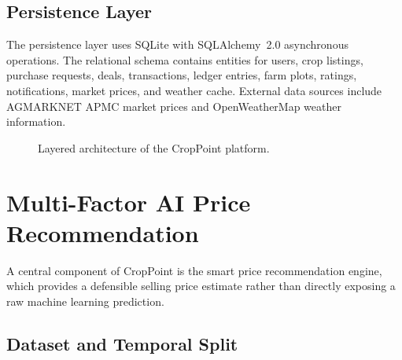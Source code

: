 \documentclass[conference]{IEEEtran}
\begin{document}
\subsection{Persistence Layer}

The persistence layer uses SQLite with SQLAlchemy~2.0 asynchronous
operations. The relational schema contains entities for users, crop
listings, purchase requests, deals, transactions, ledger entries,
farm plots, ratings, notifications, market prices, and weather
cache. External data sources include AGMARKNET APMC market prices
and OpenWeatherMap weather information.

\begin{figure}[htbp]
\centering
{}
\caption{Layered architecture of the CropPoint platform.}
\label{fig:architecture}
\end{figure}

\section{Multi-Factor AI Price Recommendation}

A central component of CropPoint is the smart price recommendation
engine, which provides a defensible selling price estimate rather
than directly exposing a raw machine learning prediction.

\subsection{Dataset and Temporal Split}
\end{document}
